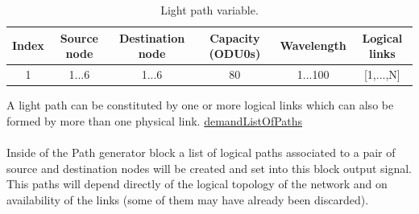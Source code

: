 \begin{table}[H]
		\centering
	\begin{tabular}{|c|c|c|c|c|c|}
		\hline
		Index                   & Source node                & Destination node           & Capacity (ODU0s)        & Wavelength & Logical links                  \\ \hline
		\multicolumn{1}{|c|}{1} & \multicolumn{1}{c|}{1...6} & \multicolumn{1}{c|}{1...6} & \multicolumn{1}{c|}{80} & \multicolumn{1}{c|}{1...100} & \multicolumn{1}{c|}{[1,...,N]}\\ \hline
	\end{tabular}
	\caption{Light path variable.}
	\label{lightpath_example}
\end{table}

A light path can be constituted by one or more logical links which can also be formed by more than one physical link.
\underline{demandListOfPaths}\\
\\
Inside of the Path generator block a list of logical paths associated to a pair of source and destination nodes will be created and set into this block output signal. This paths will depend directly of the logical topology of the network and on availability of the links (some of them may have already been discarded).



